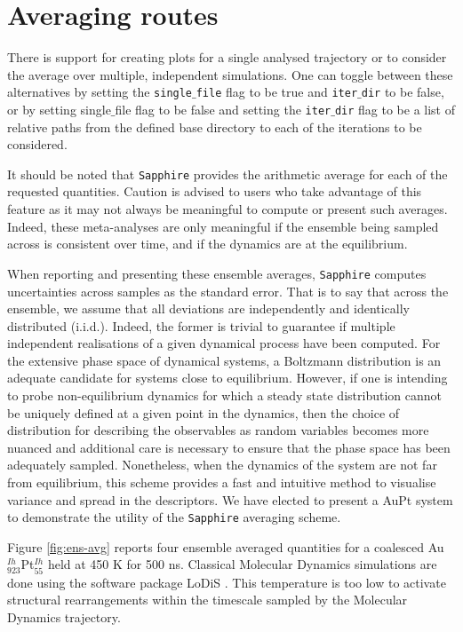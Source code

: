 \section{Averaging routes}
\label{sec:Ave}
There is support for creating plots for a single analysed trajectory or to consider the average over multiple, independent simulations.
%
One can toggle between these alternatives by setting the \texttt{single$\_$file} flag to be true and \texttt{iter$\_$dir} to be false, or by setting single$\_$file flag to be false and setting the \texttt{iter$\_$dir} flag to be a list of relative paths from the defined base directory to each of the iterations to be considered. 
%

It should be noted that \texttt{Sapphire} provides the arithmetic average for each of the requested quantities. Caution is advised to users who take advantage of this feature as it may not always be meaningful to compute or present such averages. 
Indeed, these meta-analyses are only meaningful if the ensemble being sampled across is consistent %
over time, and if the dynamics are at the equilibrium.

When reporting and presenting these ensemble averages, \texttt{Sapphire} computes uncertainties across samples as the standard error. 
That is to say that across the ensemble, we assume that all deviations are independently and identically distributed (i.i.d.). 
Indeed, the former is trivial to guarantee if multiple independent realisations of a given dynamical process have been computed.
For the extensive phase space of dynamical systems, a Boltzmann distribution is an adequate candidate for systems close to equilibrium.
However, if one is intending to probe non-equilibrium dynamics for which a steady state distribution cannot be uniquely defined at a given point in the dynamics, then the choice of distribution for describing the observables as random variables becomes more nuanced and additional care is necessary to ensure that the phase space has been adequately sampled.
%
Nonetheless, when the dynamics of the system are not far from equilibrium, this scheme provides a fast and intuitive method to visualise variance and spread in the descriptors. We have elected to present a AuPt system to demonstrate the utility of the \texttt{Sapphire} averaging scheme. 

Figure \ref{fig:ens-avg} reports four ensemble averaged quantities for a coalesced Au$_{923}^{Ih}$Pt$_{55}^{Ih}$ held at 450 K for 500 ns. Classical Molecular Dynamics simulations are done using the software package LoDiS \cite{LoDiS}.
This temperature is too low to activate structural rearrangements within the timescale sampled by the Molecular Dynamics trajectory. 
%

